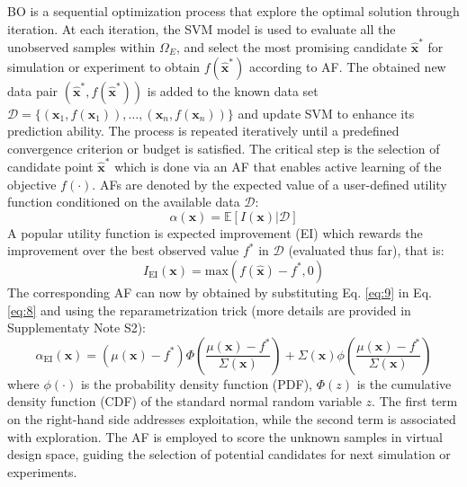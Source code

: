\documentclass[preprint,review,12pt,authoryear]{elsarticle}
\begin{document}
BO is a sequential optimization process that explore the optimal solution through iteration. At each iteration, the SVM model is used to evaluate all the unobserved samples within $\Omega_E$, and select the most promising candidate $\hat{\boldsymbol{x}}^*$ for simulation or experiment to obtain $f(\hat{\boldsymbol{x}}^*)$ according to AF. The obtained new data pair $(\hat{\boldsymbol{x}}^*, f(\hat{\boldsymbol{x}}^*))$ is added to the known data set $\mathcal{D} = \{(\boldsymbol{x}_1, f(\boldsymbol{x}_1)), \ldots, (\boldsymbol{x}_n, f(\boldsymbol{x}_n))\}$ and update SVM to enhance its prediction ability. The process is repeated iteratively until a predefined convergence criterion or budget is satisfied. The critical step is the selection of candidate point $\hat{\boldsymbol{x}}^*$ which is done via an AF that enables active learning of the objective $f(\cdot)$\citep{Settles2009ActiveLL}. AFs are denoted by the expected value of a user-defined utility function conditioned on the available data $\mathcal{D}$:
\begin{equation}
    \alpha(\boldsymbol{x}) = \mathbb{E}[I(\boldsymbol{x})|\mathcal{D}]
\label{eq:8}
\end{equation}
A popular utility function is expected improvement (EI) which rewards the improvement over the best observed value $f^*$ in $\mathcal{D}$ (evaluated thus far), that is:
\begin{equation}
    I_\text{EI}(\boldsymbol{x})=\text{max}(f(\hat{\boldsymbol{x}})-f^*, 0)
    \label{eq:9}
\end{equation}
The corresponding AF can now by obtained by substituting Eq. \ref{eq:9} in Eq. \ref{eq:8} and using the reparametrization trick (more details are provided in Supplementaty Note S2):
\begin{equation}
\alpha_\text{EI}(\boldsymbol{x}) = \left(\mu(\boldsymbol{x}) - f^*\right) \Phi\left(\frac{\mu(\boldsymbol{x}) - f^*}{\Sigma(\boldsymbol{x})}\right) + \Sigma(\boldsymbol{x}) \phi\left(\frac{\mu(\boldsymbol{x}) - f^*}{\Sigma(\boldsymbol{x})}\right)
\label{eq:10}
\end{equation}
where $\phi(\cdot)$ is the probability density function (PDF), $\Phi(z)$ is the cumulative density function (CDF) of the standard normal random variable $z$.
The first term on the right-hand side addresses exploitation, while the second term is associated with exploration. The AF is employed to score the unknown samples in virtual design space, guiding the selection of potential candidates for next simulation or experiments.
\end{document}
